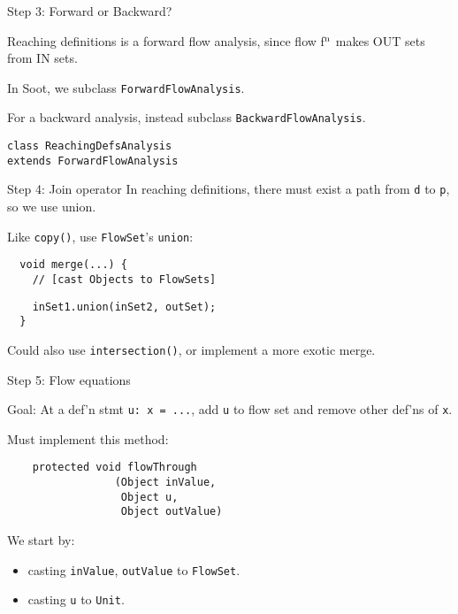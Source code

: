 \begin{slide}{Step 3: Forward or Backward?}

Reaching definitions is a forward flow analysis, since flow f$^{\mbox{\scriptsize n}}$ makes
{\sf OUT} sets from {\sf IN} sets.

\qquad

In Soot, we subclass {\tt \green ForwardFlowAnalysis}.

\qquad

For a backward analysis, instead subclass {\tt BackwardFlowAnalysis}.

\qquad

{\green \tt class ReachingDefsAnalysis \\ \qquad extends ForwardFlowAnalysis}
\end{slide}

\begin{slide}{Step 4: Join operator}
In reaching definitions, there must exist a path from {\tt d} to
{\tt p}, so we use union.

\qquad

Like {\tt copy()}, use {\tt FlowSet}'s {\tt union}:

\vspace*{0.05in}

\begin{verbatim}
  void merge(...) {
    // [cast Objects to FlowSets]
\end{verbatim}
{\green\verb+    inSet1.union(inSet2, outSet);+}\\
\verb+  }+

\vspace*{0.1in}

Could also use {\tt intersection()}, or implement a more exotic merge.

\end{slide}

\begin{slide}{Step 5: Flow equations}
\vspace*{-0.1in}

Goal: At a def'n stmt {\tt u: x = ...}, add {\tt u} to
flow set and remove other def'ns of {\tt x}.

\vspace*{0.1in}

Must implement this method:
\begin{verbatim}
    protected void flowThrough
                 (Object inValue, 
                  Object u, 
                  Object outValue)
\end{verbatim}

We start by:
\begin{itemize}
\item casting {\tt inValue}, {\tt outValue} to {\tt FlowSet}.

\item casting {\tt u} to {\tt Unit}.
\end{itemize}
\end{slide}

